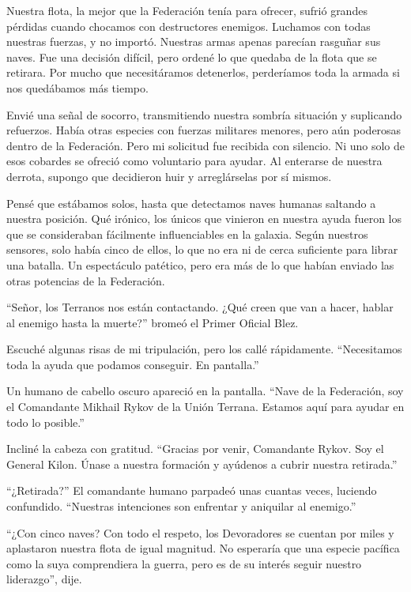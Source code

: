 Nuestra flota, la mejor que la Federación tenía para ofrecer, sufrió grandes pérdidas cuando chocamos con destructores enemigos. Luchamos con todas nuestras fuerzas, y no importó. Nuestras armas apenas parecían rasguñar sus naves. Fue una decisión difícil, pero ordené lo que quedaba de la flota que se retirara. Por mucho que necesitáramos detenerlos, perderíamos toda la armada si nos quedábamos más tiempo.

Envié una señal de socorro, transmitiendo nuestra sombría situación y suplicando refuerzos. Había otras especies con fuerzas militares menores, pero aún poderosas dentro de la Federación. Pero mi solicitud fue recibida con silencio. Ni uno solo de esos cobardes se ofreció como voluntario para ayudar. Al enterarse de nuestra derrota, supongo que decidieron huir y arreglárselas por sí mismos.

Pensé que estábamos solos, hasta que detectamos naves humanas saltando a nuestra posición. Qué irónico, los únicos que vinieron en nuestra ayuda fueron los que se consideraban fácilmente influenciables en la galaxia. Según nuestros sensores, solo había cinco de ellos, lo que no era ni de cerca suficiente para librar una batalla. Un espectáculo patético, pero era más de lo que habían enviado las otras potencias de la Federación.

``Señor, los Terranos nos están contactando. ¿Qué creen que van a hacer, hablar al enemigo hasta la muerte?'' bromeó el Primer Oficial Blez.

Escuché algunas risas de mi tripulación, pero los callé rápidamente. ``Necesitamos toda la ayuda que podamos conseguir. En pantalla.''

Un humano de cabello oscuro apareció en la pantalla. ``Nave de la Federación, soy el Comandante Mikhail Rykov de la Unión Terrana. Estamos aquí para ayudar en todo lo posible.''

Incliné la cabeza con gratitud. ``Gracias por venir, Comandante Rykov. Soy el General Kilon. Únase a nuestra formación y ayúdenos a cubrir nuestra retirada.''

``¿Retirada?'' El comandante humano parpadeó unas cuantas veces, luciendo confundido. ``Nuestras intenciones son enfrentar y aniquilar al enemigo.''

``¿Con cinco naves? Con todo el respeto, los Devoradores se cuentan por miles y aplastaron nuestra flota de igual magnitud. No esperaría que una especie pacífica como la suya comprendiera la guerra, pero es de su interés seguir nuestro liderazgo'', dije.

